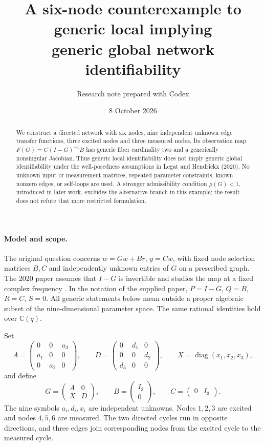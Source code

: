 \documentclass[11pt,a4paper]{article}
\title{A six-node counterexample to generic local implying\texorpdfstring{\\}{ }generic global network identifiability}
\author{Research note prepared with Codex}
\date{8 October 2026}
\newcommand{\diag}{\operatorname{diag}}
\begin{document}
\maketitle

\begin{abstract}
We construct a directed network with six nodes, nine independent unknown
edge transfer functions, three excited nodes and three measured nodes.
Its observation map $F(G)=C(I-G)^{-1}B$ has generic fiber cardinality two
and a generically nonsingular Jacobian. Thus generic local identifiability
does not imply generic global identifiability under the well-posedness
assumptions in Legat and Hendrickx (2020). No unknown input or measurement
matrices, repeated parameter constraints, known nonzero edges, or self-loops
are used. A stronger admissibility condition $\rho(G)<1$, introduced in
later work, excludes the alternative branch in this example; the result
does not refute that more restricted formulation.
\end{abstract}

\paragraph{Model and scope.}
The original question concerns $w=Gw+Br$, $y=Cw$, with fixed node selection
matrices $B,C$ and independently unknown entries of $G$ on a prescribed
graph. The 2020 paper assumes that $I-G$ is invertible and studies the map
at a fixed complex frequency \cite{LH20}. In the notation of the supplied
paper, $P=I-G$, $Q=B$, $R=C$, $S=0$.
All generic statements below mean outside a proper algebraic subset of
the nine-dimensional parameter space. The same rational identities hold
over $\mathbb C(q)$.

Set
\[
 A=\begin{pmatrix}0&0&a_3\\a_1&0&0\\0&a_2&0\end{pmatrix},\qquad
 D=\begin{pmatrix}0&d_1&0\\0&0&d_2\\d_3&0&0\end{pmatrix},\qquad
 X=\diag(x_1,x_2,x_3),
\]
and define
\begin{equation}\label{eq:model}
 G=\begin{pmatrix}A&0\\X&D\end{pmatrix},\qquad
 B=\begin{pmatrix}I_3\\0\end{pmatrix},\qquad
 C=\begin{pmatrix}0&I_3\end{pmatrix}.
\end{equation}
The nine symbols $a_i,d_i,x_i$ are independent unknowns.
Nodes $1,2,3$ are excited and nodes $4,5,6$ are measured.
The two directed cycles run in opposite directions, and three edges join
corresponding nodes from the excited cycle to the measured cycle.
\end{document}
